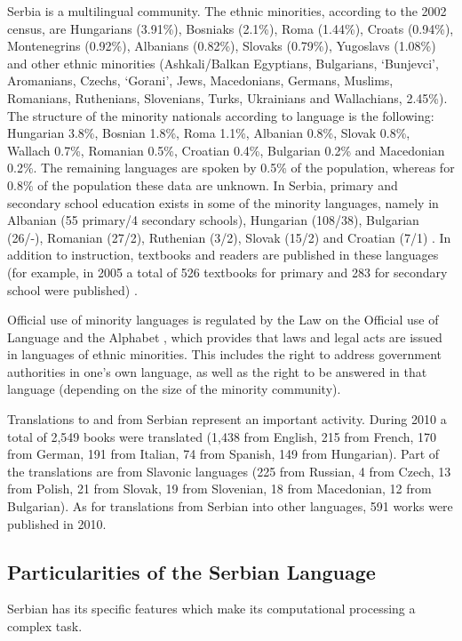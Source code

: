 \begin{multicols}{2}
Serbia is a multilingual community. The ethnic minorities, \cite{Ombudsman} according to the 2002 census, are Hungarians (3.91\%), Bosniaks (2.1\%), Roma (1.44\%), Croats (0.94\%), Montenegrins (0.92\%), Albanians (0.82\%), Slovaks (0.79\%), Yugoslavs (1.08\%) and other ethnic minorities (Ashkali/Balkan Egyptians, Bulgarians, ‘Bunjevci’, Aromanians, Czechs, ‘Gorani’, Jews, Macedonians, Germans, Muslims, Romanians, Ruthenians, Slovenians, Turks, Ukrainians and Wallachians, 2.45\%).  The structure of the minority nationals according to language is the following: Hungarian 3.8\%,  Bosnian 1.8\%,  Roma 1.1\%,  Albanian 0.8\%,  Slovak 0.8\%, Wallach 0.7\%, Romanian 0.5\%,  Croatian 0.4\%,  Bulgarian 0.2\% and Macedonian 0.2\%.  The remaining languages are spoken by 0.5\% of the population, whereas for 0.8\% of the population these data are unknown. In Serbia, primary and secondary school education exists in some of the minority languages, namely in Albanian (55 primary/4 secondary schools), Hungarian (108/38), Bulgarian (26/-), Romanian (27/2), Ruthenian (3/2), Slovak (15/2) and Croatian (7/1) \cite{GOD2010}. In addition to instruction, textbooks and readers are published in these languages (for example, in 2005 a total of 526 textbooks for primary and 283 for secondary school were published) \cite{HDR}.

Official use of minority languages is regulated by the Law on the Official use of Language and the Alphabet \cite{SGRS}, which provides that laws and legal acts are issued in languages of ethnic minorities. This includes the right to address government authorities in one’s own language, as well as the right to be answered in that language (depending on the size of the minority community).

Translations to and from Serbian represent an important activity. During 2010 a total of 2,549 books were translated (1,438 from English, 215 from French, 170 from German, 191 from Italian, 74 from Spanish, 149 from Hungarian). Part of the translations are from Slavonic languages (225 from Russian, 4 from Czech, 13 from Polish, 21 from Slovak, 19 from Slovenian, 18 from Macedonian, 12 from Bulgarian). As for translations from Serbian into other languages, 591 works were published in 2010. 

\subsection{Particularities of the Serbian Language}

Serbian has its specific features which make its computational processing a complex task. 


\end{multicols}
